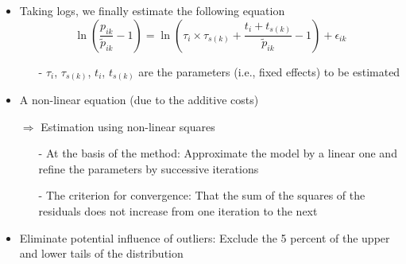 \documentclass[10 pt,Helvetica, french]{beamer}
\begin{document}
\begin{frame}
\begin{itemize}
\item Taking logs, we finally estimate the following equation
\footnotesize
\begin{equation}
\ln\left(\frac{p_{ik}}{\widetilde{p}_{ik}}-1 \right)= \ln \left(\tau_{i} \times \tau_{s(k)}+\frac{t_{i} + t_{s(k)}}{\widetilde{p}_{ik}}-1 \right) + \epsilon_{ik} \label{eq:est_equation}
\end{equation}
\normalsize
\begin{itemize}
\item[-] $\tau_i$, $\tau_{s(k)}$, $t_i$, $t_{s(k)}$ are the parameters (i.e., fixed effects) to be estimated \vspace{0.1cm}
\end{itemize}
\item A non-linear equation (due to the additive costs)  \vspace{0.1cm}
\item[$\Rightarrow$] Estimation using non-linear squares \vspace{0.1cm}
\begin{itemize}
\item[-] At the basis of the method: Approximate the model by a linear one and refine the parameters by successive iterations \vspace{0.1cm}
\item[-] The criterion for convergence: That the sum of the squares of the residuals does not increase from one iteration to the next \vspace{0.1cm}
\end{itemize}
\item Eliminate potential influence of outliers: Exclude the 5 percent of the upper and lower tails of the distribution
\end{itemize}
\end{frame}
\end{document}
